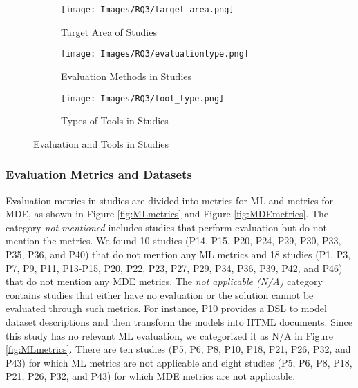 \begin{figure}[htbp]
    \centering
    \begin{subfigure}{0.3\textwidth}
    \texttt{[image: Images/RQ3/target\_area.png]}
    \caption{Target Area of Studies}
    \label{fig:TargetAreas}
    \vspace*{-1em}
    \end{subfigure}
\hfill
    \begin{subfigure}{0.3\textwidth}
    \centering
    \texttt{[image: Images/RQ3/evaluationtype.png]}
    \caption{Evaluation Methods in Studies}
    \label{fig:evalMethods}
    \vspace*{-1em}
\end{subfigure}
\hfill
    \begin{subfigure}{0.3\textwidth}
    \centering
    \texttt{[image: Images/RQ3/tool\_type.png]}
    \caption{Types of Tools in Studies}
    \label{fig:ToolType}
    \vspace*{-1em}
\end{subfigure}
    \vspace*{1em}
 \caption{Evaluation and Tools in Studies}
\end{figure}

\subsubsection{Evaluation Metrics and Datasets} 

Evaluation metrics in studies are divided into metrics for ML and metrics for MDE, as shown in Figure \ref{fig:MLmetrics} and Figure \ref{fig:MDEmetrics}. The category \textit{not mentioned} includes studies that perform evaluation but do not mention the metrics. We found  10 studies (P14, P15, P20, P24, P29, P30, P33, P35, P36, and P40) that do not mention any ML metrics and 18 studies (P1, P3, P7, P9, P11, P13-P15, P20, P22, P23, P27, P29, P34, P36, P39, P42, and P46) that do not mention any MDE metrics. The \textit{not applicable (N/A)} category contains studies that either have no evaluation or the solution cannot be evaluated through such metrics. For instance, P10 provides a DSL to model dataset descriptions and then transform the models into HTML documents. Since this study has no relevant ML evaluation, we categorized it as N/A in Figure \ref{fig:MLmetrics}. There are ten studies (P5, P6, P8, P10, P18, P21, P26, P32, and P43) for which ML metrics are not applicable and eight studies (P5, P6, P8, P18, P21, P26, P32, and P43) for which MDE metrics are not applicable.

